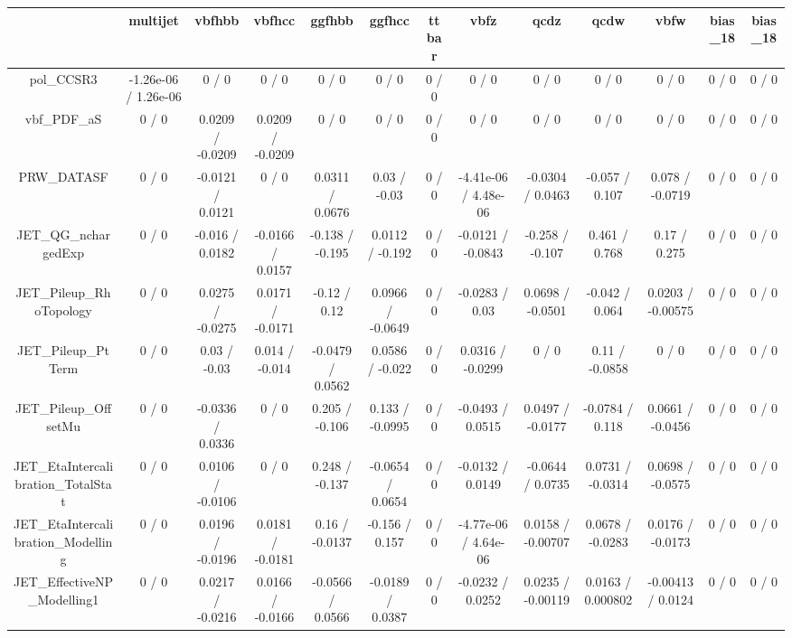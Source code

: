 \documentclass[10pt]{article}
\begin{document}
\begin{table}[htbp]
\begin{center}
\begin{tabular}{|c|c|c|c|c|c|c|c|c|c|c|c|c|}
\hline 
      & multijet      & vbfhbb      & vbfhcc      & ggfhbb      & ggfhcc      & ttbar      & vbfz      & qcdz      & qcdw      & vbfw      & bias_18      & bias_18 \\ 
\hline 
  pol_CCSR3 & -1.26e-06 / 1.26e-06 & 0 / 0 & 0 / 0 & 0 / 0 & 0 / 0 & 0 / 0 & 0 / 0 & 0 / 0 & 0 / 0 & 0 / 0 & 0 / 0 & 0 / 0 \\ 
  vbf_PDF_aS & 0 / 0 & 0.0209 / -0.0209 & 0.0209 / -0.0209 & 0 / 0 & 0 / 0 & 0 / 0 & 0 / 0 & 0 / 0 & 0 / 0 & 0 / 0 & 0 / 0 & 0 / 0 \\ 
  PRW_DATASF & 0 / 0 & -0.0121 / 0.0121 & 0 / 0 & 0.0311 / 0.0676 & 0.03 / -0.03 & 0 / 0 & -4.41e-06 / 4.48e-06 & -0.0304 / 0.0463 & -0.057 / 0.107 & 0.078 / -0.0719 & 0 / 0 & 0 / 0 \\ 
  JET_QG_nchargedExp & 0 / 0 & -0.016 / 0.0182 & -0.0166 / 0.0157 & -0.138 / -0.195 & 0.0112 / -0.192 & 0 / 0 & -0.0121 / -0.0843 & -0.258 / -0.107 & 0.461 / 0.768 & 0.17 / 0.275 & 0 / 0 & 0 / 0 \\ 
  JET_Pileup_RhoTopology & 0 / 0 & 0.0275 / -0.0275 & 0.0171 / -0.0171 & -0.12 / 0.12 & 0.0966 / -0.0649 & 0 / 0 & -0.0283 / 0.03 & 0.0698 / -0.0501 & -0.042 / 0.064 & 0.0203 / -0.00575 & 0 / 0 & 0 / 0 \\ 
  JET_Pileup_PtTerm & 0 / 0 & 0.03 / -0.03 & 0.014 / -0.014 & -0.0479 / 0.0562 & 0.0586 / -0.022 & 0 / 0 & 0.0316 / -0.0299 & 0 / 0 & 0.11 / -0.0858 & 0 / 0 & 0 / 0 & 0 / 0 \\ 
  JET_Pileup_OffsetMu & 0 / 0 & -0.0336 / 0.0336 & 0 / 0 & 0.205 / -0.106 & 0.133 / -0.0995 & 0 / 0 & -0.0493 / 0.0515 & 0.0497 / -0.0177 & -0.0784 / 0.118 & 0.0661 / -0.0456 & 0 / 0 & 0 / 0 \\ 
  JET_EtaIntercalibration_TotalStat & 0 / 0 & 0.0106 / -0.0106 & 0 / 0 & 0.248 / -0.137 & -0.0654 / 0.0654 & 0 / 0 & -0.0132 / 0.0149 & -0.0644 / 0.0735 & 0.0731 / -0.0314 & 0.0698 / -0.0575 & 0 / 0 & 0 / 0 \\ 
  JET_EtaIntercalibration_Modelling & 0 / 0 & 0.0196 / -0.0196 & 0.0181 / -0.0181 & 0.16 / -0.0137 & -0.156 / 0.157 & 0 / 0 & -4.77e-06 / 4.64e-06 & 0.0158 / -0.00707 & 0.0678 / -0.0283 & 0.0176 / -0.0173 & 0 / 0 & 0 / 0 \\ 
  JET_EffectiveNP_Modelling1 & 0 / 0 & 0.0217 / -0.0216 & 0.0166 / -0.0166 & -0.0566 / 0.0566 & -0.0189 / 0.0387 & 0 / 0 & -0.0232 / 0.0252 & 0.0235 / -0.00119 & 0.0163 / 0.000802 & -0.00413 / 0.0124 & 0 / 0 & 0 / 0 \\ 

\end{tabular}
\end{center}
\end{table}
\end{document}
